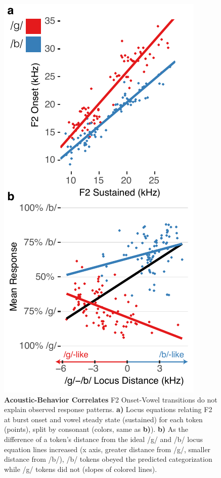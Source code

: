 \documentclass[11pt]{article}\usepackage[]{graphicx}\usepackage[]{color}
\begin{document}
\begin{figure}[!t]
\includegraphics[width=\linewidth]{../figures/Figure5.pdf}
\caption{\textbf{Acoustic-Behavior Correlates} F2 Onset-Vowel transitions do not explain observed response patterns. \textbf{a)} Locus equations relating F2 at burst onset and vowel steady state (sustained) for each token (points), split by consonant (colors, same as \textbf{b)}). \textbf{b)} As the difference of a token's distance from the ideal /g/ and /b/ locus equation lines increased (x axis, greater distance from /g/, smaller distance from /b/), /b/ tokens obeyed the predicted categorization while /g/ tokens did not (slopes of colored lines). \vspace{24pt}}
\label{acoustic}
\end{figure}
\end{document}
